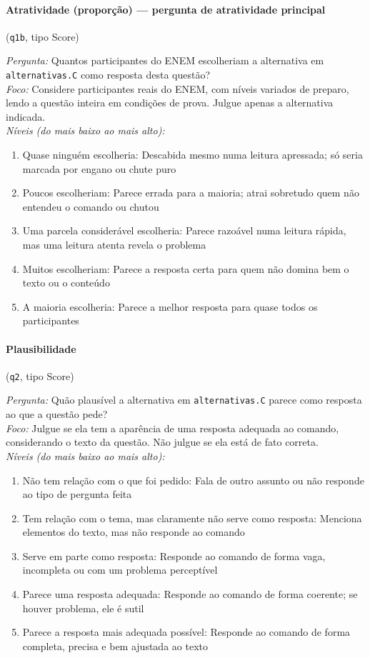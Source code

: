 \paragraph{Atratividade (proporção) --- pergunta de atratividade principal} (\texttt{q1b}, tipo Score)

\textit{Pergunta:} Quantos participantes do ENEM escolheriam a alternativa em \texttt{alternativas.C} como resposta desta questão?\\
\textit{Foco:} Considere participantes reais do ENEM, com níveis variados de preparo, lendo a questão inteira em condições de prova. Julgue apenas a alternativa indicada.\\
\textit{Níveis (do mais baixo ao mais alto):}
\begin{enumerate}[nosep,label=\arabic*.,start=0]
  \item Quase ninguém escolheria: Descabida mesmo numa leitura apressada; só seria marcada por engano ou chute puro
  \item Poucos escolheriam: Parece errada para a maioria; atrai sobretudo quem não entendeu o comando ou chutou
  \item Uma parcela considerável escolheria: Parece razoável numa leitura rápida, mas uma leitura atenta revela o problema
  \item Muitos escolheriam: Parece a resposta certa para quem não domina bem o texto ou o conteúdo
  \item A maioria escolheria: Parece a melhor resposta para quase todos os participantes
\end{enumerate}

\paragraph{Plausibilidade} (\texttt{q2}, tipo Score)

\textit{Pergunta:} Quão plausível a alternativa em \texttt{alternativas.C} parece como resposta ao que a questão pede?\\
\textit{Foco:} Julgue se ela tem a aparência de uma resposta adequada ao comando, considerando o texto da questão. Não julgue se ela está de fato correta.\\
\textit{Níveis (do mais baixo ao mais alto):}
\begin{enumerate}[nosep,label=\arabic*.,start=0]
  \item Não tem relação com o que foi pedido: Fala de outro assunto ou não responde ao tipo de pergunta feita
  \item Tem relação com o tema, mas claramente não serve como resposta: Menciona elementos do texto, mas não responde ao comando
  \item Serve em parte como resposta: Responde ao comando de forma vaga, incompleta ou com um problema perceptível
  \item Parece uma resposta adequada: Responde ao comando de forma coerente; se houver problema, ele é sutil
  \item Parece a resposta mais adequada possível: Responde ao comando de forma completa, precisa e bem ajustada ao texto
\end{enumerate}

